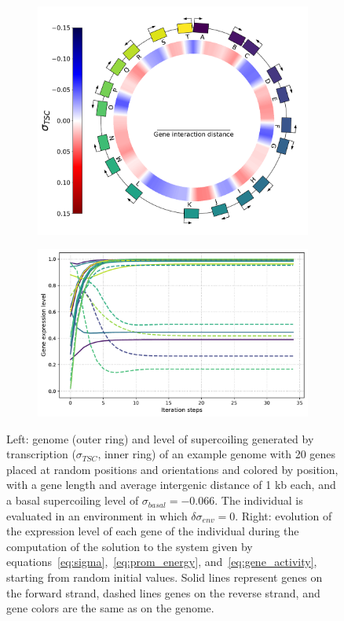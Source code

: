 \begin{figure}[H]
\centering
\begin{subfigure}[t]{0.44\textwidth}
\includegraphics[width=\textwidth]{ploscb/img/random_genome_and_tsc.pdf}
\label{subfig:ploscb:random_genome}
\end{subfigure}
\begin{subfigure}[t]{0.55\textwidth}
\includegraphics[width=\textwidth]{ploscb/img/random_gene_expr.pdf}
\label{subfig:ploscb:random_expr}
\end{subfigure}
\caption[Example individual in the advanced model, evaluated in both environments]{Left: genome (outer ring) and level of supercoiling generated by transcription ($\sigma_{TSC}$, inner ring) of an example genome with 20 genes placed at random positions and orientations and colored by position, with a gene length and average intergenic distance of 1 kb each, and a basal supercoiling level of $\sigma_{basal} = -0.066$.
The individual is evaluated in an environment in which $\delta\sigma_{env} = 0$.
Right: evolution of the expression level of each gene of the individual during the computation of the solution to the system given by equations~\ref{eq:sigma},~\ref{eq:prom_energy}, and~\ref{eq:gene_activity}, starting from random initial values.
Solid lines represent genes on the forward strand, dashed lines genes on the reverse strand, and gene colors are the same as on the genome.}
\label{fig:ploscb:random_indiv}
\end{figure}

